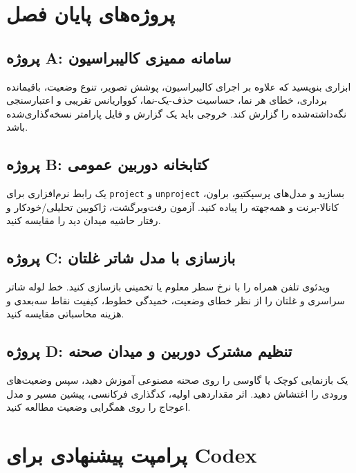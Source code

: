 \documentclass[12pt,openany,oneside]{book}
\begin{document}
\section{پروژه‌های پایان فصل}

\subsection{پروژه A: سامانه ممیزی کالیبراسیون}
ابزاری بنویسید که علاوه بر اجرای کالیبراسیون، پوشش تصویر، تنوع وضعیت، باقیمانده برداری، خطای هر نما، حساسیت حذف-یک-نما،
کوواریانس تقریبی و اعتبارسنجی نگه‌داشته‌شده را گزارش کند. خروجی باید یک گزارش  و فایل پارامتر نسخه‌گذاری‌شده باشد.

\subsection{پروژه B: کتابخانه دوربین عمومی}
یک رابط نرم‌افزاری برای \texttt{project} و \texttt{unproject} بسازید و مدل‌های پرسپکتیو، براون، کانالا-برنت و همه‌جهته را
پیاده کنید. آزمون رفت‌وبرگشت، ژاکوبین تحلیلی/خودکار و رفتار حاشیه میدان دید را مقایسه کنید.

\subsection{پروژه C: بازسازی با مدل شاتر غلتان}
ویدئوی تلفن همراه را با نرخ سطر معلوم یا تخمینی بازسازی کنید. خط لوله شاتر سراسری و غلتان را از نظر خطای وضعیت، خمیدگی خطوط،
کیفیت نقاط سه‌بعدی و هزینه محاسباتی مقایسه کنید.

\subsection{پروژه D: تنظیم مشترک دوربین و میدان صحنه}
یک بازنمایی کوچک  یا گاوسی را روی صحنه مصنوعی آموزش دهید، سپس وضعیت‌های ورودی را اغتشاش دهید. اثر مقداردهی اولیه،
کدگذاری فرکانسی، پیشین مسیر و مدل اعوجاج را روی همگرایی وضعیت مطالعه کنید.

\section{پرامپت پیشنهادی برای Codex}
\end{document}
